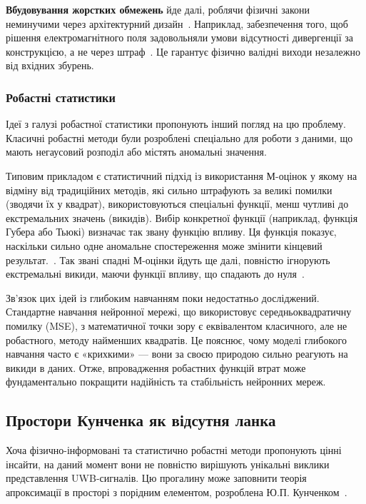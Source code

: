 \documentclass[12pt,a4paper]{article}
\begin{document}
\textbf{Вбудовування жорстких обмежень} йде далі, роблячи фізичні закони неминучими через архітектурний дизайн~\cite{physical_constraints_2020}. Наприклад, забезпечення того, щоб рішення електромагнітного поля задовольняли умови відсутності дивергенції за конструкцією, а не через штраф~\cite{hard_constraints_2023}. Це гарантує фізично валідні виходи незалежно від вхідних збурень.

\subsubsection{Робастні статистики}

Ідеї з галузі робастної статистики пропонують інший погляд на цю проблему. Класичні робастні методи були розроблені спеціально для роботи з даними, що мають негаусовий розподіл або містять аномальні значення. 

Типовим прикладом є статистичний підхід із використання М-оцінок у якому на відміну від традиційних методів, які сильно штрафують за великі помилки (зводячи їх у квадрат), використовуються спеціальні функції, менш чутливі до екстремальних значень (викидів). Вибір конкретної функції (наприклад, функція Губера або Тьюкі) визначає так звану функцію впливу. Ця функція показує, наскільки сильно одне аномальне спостереження може змінити кінцевий результат.~\cite{huber2011robust}. Так звані спадні М-оцінки йдуть ще далі, повністю ігнорують екстремальні викиди, маючи функції впливу, що спадають до нуля~\cite{hampel2011robust}. 

Зв'язок цих ідей із глибоким навчанням поки недостатньо досліджений. Стандартне навчання нейронної мережі, що використовує середньоквадратичну помилку (MSE), з математичної точки зору є еквівалентом класичного, але не робастного, методу найменших квадратів. Це пояснює, чому моделі глибокого навчання часто є «крихкими» — вони за своєю природою сильно реагують на викиди в даних. Отже, впровадження робастних функцій втрат може фундаментально покращити надійність та стабільність нейронних мереж.

\subsection{Простори Кунченка як відсутня ланка}


Хоча фізично-інформовані та статистично робастні методи пропонують цінні інсайти, на даний момент вони не повністю вирішують унікальні виклики представлення UWB-сигналів. Цю прогалину може заповнити теорія апроксимації в просторі з порідним елементом, розроблена Ю.П. Кунченком~\cite{kunchenko2003polynomial}.
\end{document}
